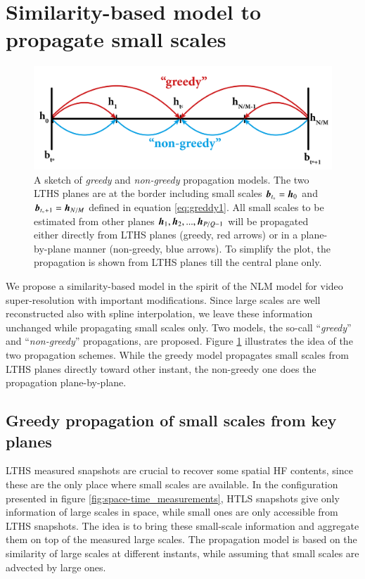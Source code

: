 \section{Similarity-based model to propagate small scales}
\begin{figure}
\centering
	\includegraphics[width=0.8\columnwidth]{./images/NLM/propagation_scheme.png}
	\caption{\label{fig:propagation_scheme} A sketch of \textit{greedy} and \textit{non-greedy} propagation models. The two LTHS planes are at the border including small scales $ \operatorname{\boldsymbol{b}}_{t_{\circ}} = \operatorname{\boldsymbol{h}}_0 $ and $ \operatorname{\boldsymbol{b}}_{t_{\circ}+1} = \operatorname{\boldsymbol{h}}_{N/M} $ defined in equation \ref{eq:greddy1}. All small scales to be estimated from other planes $ \operatorname{\boldsymbol{h}}_1, \operatorname{\boldsymbol{h}}_2,...,\operatorname{\boldsymbol{h}}_{P/Q-1} $ will be propagated either directly from LTHS planes (greedy, red arrows) or in a plane-by-plane manner (non-greedy, blue arrows). To simplify the plot, the propagation is shown from LTHS planes till the central plane only.}
\end{figure}

We propose a similarity-based model in the spirit of the NLM model for video super-resolution with important modifications. Since large scales are well reconstructed also with spline interpolation, we leave these information unchanged while propagating small scales only. Two models, the so-call ``\textit{greedy}'' and ``\textit{non-greedy}'' propagations, are proposed. Figure \ref{fig:propagation_scheme} illustrates the idea of the two propagation schemes. While the greedy model propagates small scales from LTHS planes directly toward other instant, the non-greedy one does the propagation plane-by-plane.

\subsection{Greedy propagation of small scales from key planes}
LTHS measured snapshots are crucial to recover some spatial HF contents, since these are the only place where small scales are available. In the configuration presented in figure \ref{fig:space-time_measurements}, HTLS snapshots give only information of large scales in space, while small ones are only accessible from LTHS snapshots. The idea is to bring these small-scale information and aggregate them on top of the measured large scales. The propagation model is based on the similarity of large scales at different instants, while assuming that small scales are advected by large ones.

